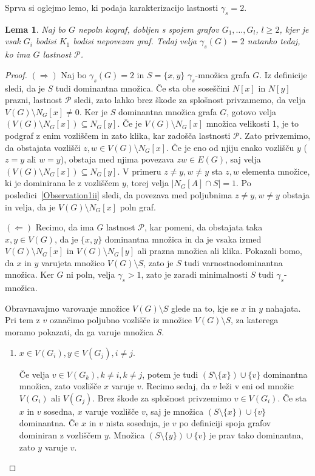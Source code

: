 \documentclass[12pt,a4paper,twoside]{article}
\theoremstyle{definition} %
\theoremstyle{plain} %
\newtheorem{lema}[definicija]{Lema}
\numberwithin{equation}{section}  %
\begin{document}
 Sprva si oglejmo lemo, ki  podaja karakterizacijo lastnosti $\gamma_s = 2$.
\begin{lema}\label{Lema4} Naj bo $G$ nepoln kograf, dobljen s spojem grafov $G_1, \dots, G_l$, $l \geq 2$, kjer je vsak $G_i$ bodisi $K_1$ bodisi nepovezan graf. Tedaj velja $\gamma_s(G) = 2$ natanko tedaj, ko ima $G$ lastnost $\mathcal{P}$.
\end{lema}
\begin{proof}
$(\Rightarrow)$ Naj bo $\gamma_s(G) = 2$ in $S = \{x,y\}$ $\gamma_s$-množica grafa $G$. Iz definicije sledi, da je $S$ tudi dominantna množica. Če sta obe soseščini $N[x]$ in $N[y]$ prazni, lastnost $\mathcal{P}$ sledi, zato lahko brez škode za splošnost privzamemo, da velja $V(G) \setminus N_G[x] \neq 0$. Ker je $S$ dominantna množica grafa $G$, gotovo velja $(V(G) \setminus N_G[x]) \subseteq N_G[y]$. Če je $V(G) \setminus N_G[x]$ množica velikosti 1, je to podgraf z enim vozliščem in zato klika, kar zadošča lastnosti $\mathcal{P}$. Zato privzemimo, da obstajata vozlišči $z,w \in V(G) \setminus N_G[x]$. Če je eno od njiju enako vozlišču $y$ ($z=y$ ali $w=y$), obstaja med njima povezava $zw \in E(G)$, saj velja $(V(G) \setminus N_G[x]) \subseteq N_G[y]$. V primeru $z \neq y, w \neq y$ sta $z,w$ elementa množice, ki je dominirana le z vozliščem $y$, torej velja $|N_G[A] \cap S| = 1$. Po posledici~\ref{Observation1ii} sledi, da povezava med poljubnima $z \neq y, w \neq y$ obstaja in velja, da je $V(G) \setminus N_G[x]$ poln graf.

$(\Leftarrow)$ Recimo, da ima $G$ lastnost $\mathcal{P}$, kar pomeni, da obstajata taka $x,y \in V(G)$, da je $\{x,y\}$ dominantna množica in da je vsaka izmed $V(G) \setminus N_G[x]$ in $V(G) \setminus N_G[y]$ ali prazna množica ali klika. Pokazali bomo, da $x$ in $y$ varujeta množico $V(G) \setminus S$, zato je $S$ tudi varnostnodominantna množica. Ker $G$ ni poln, velja $\gamma_s > 1$, zato je zaradi minimalnosti $S$ tudi $\gamma_s$-množica.

Obravnavajmo varovanje množice $V(G) \setminus S$ glede na to, kje se $x$ in $y$ nahajata. Pri tem z $v$ označimo poljubno vozlišče iz množice $V(G) \setminus S$, za katerega moramo pokazati, da ga varuje množica $S$.
\begin{enumerate}[label=($\roman*$)]
\item $x \in V(G_i), y \in V(G_j), i \neq j$.

Če velja $v \in V(G_k), k \neq i, k \neq j$, potem je tudi $(S \setminus \{x\}) \cup \{v\}$ dominantna množica, zato vozlišče $x$ varuje $v$. Recimo sedaj, da $v$ leži v eni od množic $V(G_i)$ ali $V(G_j)$. Brez škode za splošnost privzemimo $v \in V(G_i)$. Če sta $x$ in $v$ sosedna, $x$ varuje vozlišče $v$, saj je množica $(S \setminus \{x\}) \cup \{v\}$ dominantna. Če $x$ in $v$ nista sosednja, je $v$ po definiciji spoja grafov dominiran z vozliščem $y$. Množica $(S \setminus \{y\}) \cup \{v\}$ je prav tako dominantna, zato $y$ varuje $v$. 


\end{enumerate}
\end{proof}
\end{document}
